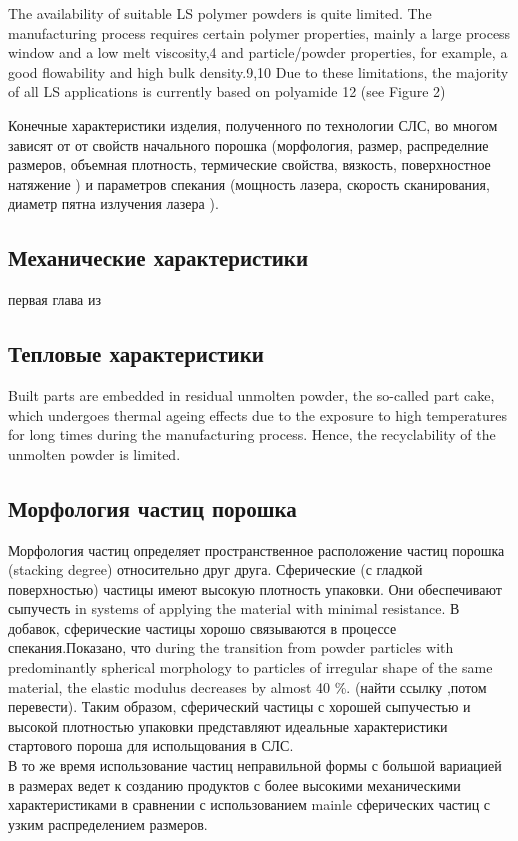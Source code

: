 The availability of suitable LS polymer powders is quite limited.
The manufacturing process requires certain polymer properties,
mainly a large process window and a low melt viscosity,4 and
particle/powder properties, for example, a good flowability and
high bulk density.9,10 Due to these limitations, the majority of
all LS applications is currently based on polyamide 12 (see Figure
2)


Конечные характеристики изделия, полученного по технологии СЛС, во многом зависят от от свойств начального порошка (морфология, размер, распределние размеров, объемная плотность, термические свойства, вязкость, поверхностное натяжение )  и параметров спекания (мощность лазера, скорость сканирования, диаметр пятна излучения лазера ).

\subsection{Механические характеристики}
первая глава из
\cite{termopols}
\subsection{Тепловые характеристики}

Built parts are embedded in residual unmolten powder, the so-called part cake, which undergoes
thermal ageing effects due to the exposure to high temperatures for long times during the manufacturing process. Hence, the
recyclability of the unmolten powder is limited. \cite{ageing}


\subsection{Морфология частиц порошка}
Морфология частиц определяет пространственное расположение частиц порошка (stacking degree) относительно друг друга. Сферические (с гладкой поверхностью) частицы имеют высокую плотность упаковки. Они обеспечивают  сыпучесть in systems of applying the material with minimal resistance. В добавок, сферические частицы хорошо связываются в процессе спекания.Показано, что 
during the transition from powder particles with predominantly spherical morphology to particles of irregular shape of the same material, the elastic modulus decreases by almost 40 \%. 
(найти ссылку ,потом перевести).
Таким образом, сферический частицы с хорошей сыпучестью и высокой плотностью упаковки представляют идеальные характеристики стартового пороша для испольщования в СЛС.\\
В то же время использование частиц неправильной формы с большой вариацией в размерах ведет к созданию продуктов с более высокими механическими характеристиками в сравнении с использованием mainle сферических частиц с узким распределением размеров.

